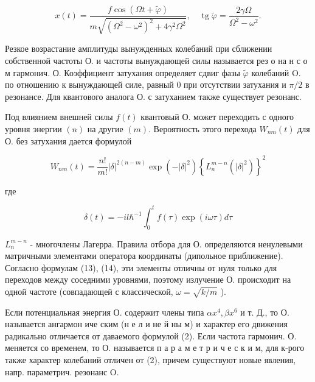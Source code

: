 \documentclass[10pt]{article}
\begin{document}
\[

x(t)=\frac{f \cos (\Omega t+\tilde{\varphi})}{m \sqrt{\left(\Omega^{2}-\omega^{2}\right)^{2}+4 \gamma^{2} \Omega^{2}}}, \quad \operatorname{tg} \tilde{\varphi}=\frac{2 \gamma \Omega}{\Omega^{2}-\omega^{2}} .

\]



Резкое возрастание амплитуды вынужденных колебаний при сближении собственной частоты О. и частоты вынуждающей силы называется рез о на н с о м гармонич. О. Коэффициент затухания определяет сдвиг фазы $\tilde{\varphi}$ колебаний O. по отношению к вынуждающей силе, равный 0 при отсутствии затухания и $\pi / 2$ в резонансе. Для квантового аналога О. с затуханием также существует резонанс.



Под влиянием внешней силы $f(t)$ квантовый О. может переходить с одного уровня энергии $(n)$ на другие $(m)$. Вероятность этого перехода $W_{n m}(t)$ для О. без затухания дается формулой



\[

W_{n m}(t)=\frac{n !}{m !}|\delta|^{2(n-m)} \exp \left(-|\delta|^{2}\right)\left\{L_{n}^{m-n}\left(|\delta|^{2}\right)\right\}^{2}

\]



где



\[

\delta(t)=-i l \hbar^{-1} \int_{0}^{t} f(\tau) \exp (i \omega \tau) d \tau

\]



$L_{n}^{m-n}$ - многочлены Лагерра. Правила отбора для О. определяются ненулевыми матричными элементами оператора координаты (дипольное приближение). Согласно формулам (13), (14), эти элементы отличны от нуля только для переходов между соседними уровнями, поэтому излучение О. происходит на одной частоте (совпадающей с классической, $\omega=\sqrt{k / m}$ ).



Если потенциальная энергия О. содержит члены типа $\alpha x^{4}, \beta x^{6}$ и т. Д., то О. называется ангармон иче ским (н е л и не й ны м) и характер его движения радикально отличается от даваемого формулой (2). Если частота гармонич. О. меняется со временем, то О. называется п а р а м е т р и ч е с к и м, для к-рого также характер колебаний отличен от (2), причем существуют новые явления, напр. параметрич. резонанс $\mathrm{O}$.
\end{document}
